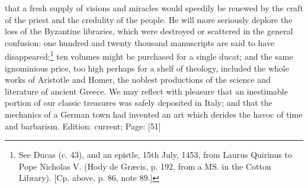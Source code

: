 that a fresh supply of visions and miracles would speedily be renewed by the craft of the priest and the credulity of the people. He will more seriously deplore the loss of the Byzantine libraries, which were destroyed or scattered in the general confusion: one hundred and twenty thousand manuscripts are said to have disappeared;\footnote{See Ducas (c. 43), and an epistle, 15th July, 1453, from Laurus Quirinus to Pope Nicholas V. (Hody de Græcis, p. 192, from a MS. in the Cotton Library). [Cp. above, p. 86, note 89.]} ten volumes might be purchased for a single ducat; and the same ignominious price, too high perhaps for a shelf of theology, included the whole works of Aristotle and Homer, the noblest productions of the science and literature of ancient Greece. We may reflect with pleasure that an inestimable portion of our classic treasures was safely deposited in Italy; and that the mechanics of a German town had invented an art which derides the havoc of time and barbarism.
Edition: current; Page: [51]

